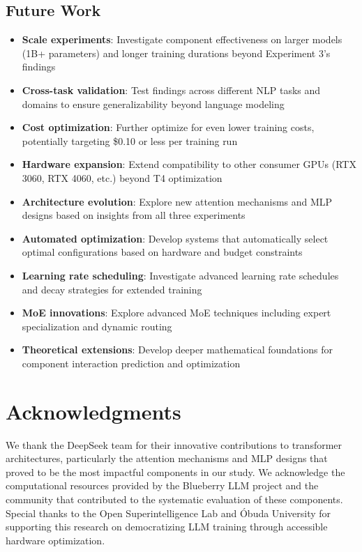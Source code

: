 \documentclass[11pt,a4paper]{article}
\begin{document}
\subsection{Future Work}

\begin{itemize}
    \item \textbf{Scale experiments}: Investigate component effectiveness on larger models (1B+ parameters) and longer training durations beyond Experiment 3's findings
    \item \textbf{Cross-task validation}: Test findings across different NLP tasks and domains to ensure generalizability beyond language modeling
    \item \textbf{Cost optimization}: Further optimize for even lower training costs, potentially targeting \$0.10 or less per training run
    \item \textbf{Hardware expansion}: Extend compatibility to other consumer GPUs (RTX 3060, RTX 4060, etc.) beyond T4 optimization
    \item \textbf{Architecture evolution}: Explore new attention mechanisms and MLP designs based on insights from all three experiments
    \item \textbf{Automated optimization}: Develop systems that automatically select optimal configurations based on hardware and budget constraints
    \item \textbf{Learning rate scheduling}: Investigate advanced learning rate schedules and decay strategies for extended training
    \item \textbf{MoE innovations}: Explore advanced MoE techniques including expert specialization and dynamic routing
    \item \textbf{Theoretical extensions}: Develop deeper mathematical foundations for component interaction prediction and optimization
\end{itemize}

\section*{Acknowledgments}

We thank the DeepSeek team for their innovative contributions to transformer architectures, particularly the attention mechanisms and MLP designs that proved to be the most impactful components in our study. We acknowledge the computational resources provided by the Blueberry LLM project and the community that contributed to the systematic evaluation of these components. Special thanks to the Open Superintelligence Lab and Óbuda University for supporting this research on democratizing LLM training through accessible hardware optimization.
\end{document}
